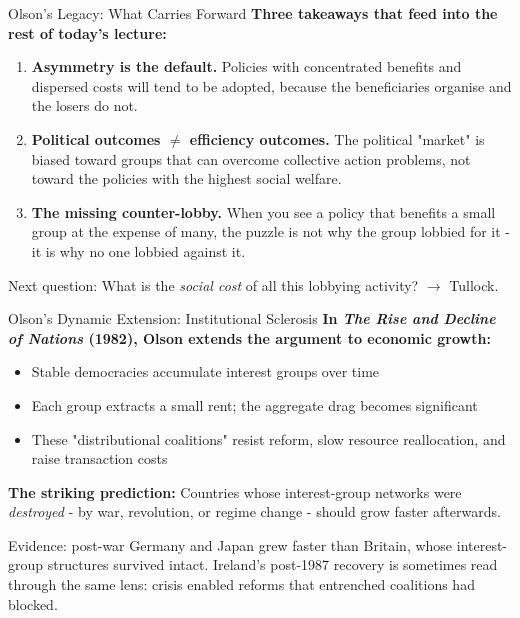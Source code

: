 \documentclass[10pt]{beamer}
\begin{document}
\begin{frame}{Olson's Legacy: What Carries Forward}
\textbf{Three takeaways that feed into the rest of today's lecture:}

\vspace{0.1cm}
\begin{enumerate}
\item \textbf{Asymmetry is the default.}
Policies with concentrated benefits and dispersed costs will tend to be adopted, because the beneficiaries organise and the losers do not.

\vspace{0.1cm}
\item \textbf{Political outcomes $\neq$ efficiency outcomes.}
The political "market" is biased toward groups that can overcome collective action problems, not toward the policies with the highest social welfare.

\vspace{0.1cm}
\item \textbf{The missing counter-lobby.}
When you see a policy that benefits a small group at the expense of many, the puzzle is not why the group lobbied for it - it is why no one lobbied against it.
\end{enumerate}

\vspace{0.1cm}
\alert{Next question:} What is the \emph{social cost} of all this lobbying activity?  $\rightarrow$ Tullock.
\end{frame}


\begin{frame}{Olson's Dynamic Extension: Institutional Sclerosis}
\textbf{In \emph{The Rise and Decline of Nations} (1982), Olson extends the argument to economic growth:}

\vspace{0.1cm}
\begin{itemize}
\item Stable democracies \alert{accumulate} interest groups over time
\item Each group extracts a small rent; the aggregate drag becomes significant
\item These "distributional coalitions" resist reform, slow resource reallocation, and raise transaction costs
\end{itemize}

\vspace{0.1cm}
\textbf{The striking prediction:}
Countries whose interest-group networks were \emph{destroyed} - by war, revolution, or regime change - should grow faster afterwards.

\vspace{0.1cm}
\alert{Evidence:} post-war Germany and Japan grew faster than Britain, whose interest-group structures survived intact.
Ireland's post-1987 recovery is sometimes read through the same lens: crisis enabled reforms that entrenched coalitions had blocked.
\end{frame}
\end{document}
